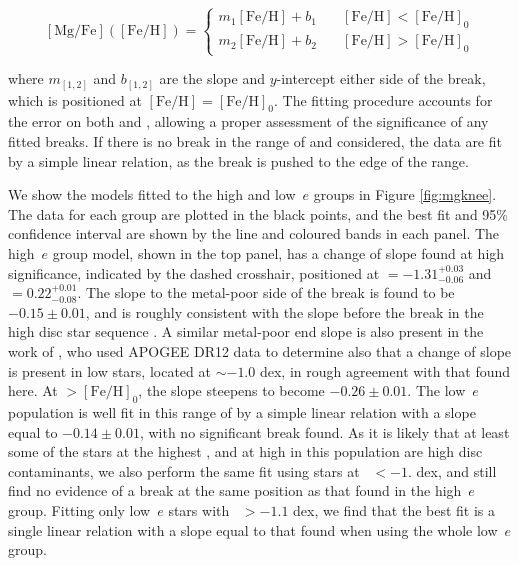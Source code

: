 \begin{equation}
\label{eq:pwlin}
\mathrm{[Mg/Fe]}(\mathrm{[Fe/H]}) =
  \begin{cases}
    m_{1}\mathrm{[Fe/H]} + b_1  &  \quad \mathrm{[Fe/H]} < \mathrm{[Fe/H]}_0\\
    m_{2}\mathrm{[Fe/H]} + b_2  &  \quad \mathrm{[Fe/H]} > \mathrm{[Fe/H]}_0
  \end{cases}
\end{equation}

\noindent where $m_{[1,2]}$ and $b_{[1,2]}$ are the slope and
$y$-intercept either side of the break, which is positioned at
$\mathrm{[Fe/H]}=\mathrm{[Fe/H]}_0$. The fitting procedure accounts
for the error on both \mgfe{} and \feh{}, allowing a proper assessment
of the significance of any fitted breaks. If there is no break in
the range of \mgfe{} and \feh{} considered, the data are fit by a
simple linear relation, as the break is pushed to the edge of the
\feh{} range.

We show the models fitted to the high and low~$e$ groups in Figure
\ref{fig:mgknee}. The data for each group are plotted in the black
points, and the best fit and 95$\%$ confidence interval are shown
by the line and coloured bands in each panel. The high~$e$ group
model, shown in the top panel, has a change of slope found at high
significance, indicated by the dashed crosshair, positioned at
\feh{}$=-1.31^{+0.03}_{-0.06}$ and \mgfe{}$=0.22^{+0.01}_{-0.08}$.
The  slope to the metal-poor side of the break is found to
be $-0.15\pm{0.01}$, and is roughly consistent with the slope before
the break in the high \mgfe{} disc star sequence \citep[e.g. that
seen in][]{2015ApJ...808..132H}. A similar metal-poor end slope 
is also present in the work of \citet{2018ApJ...852...50F},
who used APOGEE DR12 data to determine also that a change of slope
is present in low \mgfe{} stars, located at \feh{}$\sim-1.0$ dex,
in rough agreement with that found here.  At \feh{}$>\mathrm{[Fe/H]}_0$,
the slope steepens to become $-0.26\pm{0.01}$. The low~$e$ population
is well fit in this range of \feh{} by a simple linear relation
with a slope equal to $-0.14\pm{0.01}$, with no significant break
found. As it is likely that at least some of the stars at the highest
\feh{}, and at high \mgfe{} in this population are high \afe{} disc
contaminants, we also perform the same fit using stars at \feh{}~$<-1.$
dex, and still find no evidence of a break at the same position as
that found in the high~$e$ group. Fitting only low~$e$ stars with
\feh{}~$>-1.1$ dex, we find that the best fit is a single linear
relation with a slope equal to that found when using the whole
low~$e$ group.

